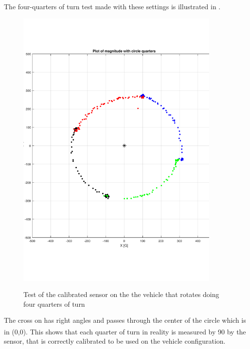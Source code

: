 The four-quarters of turn test made with these settings is illustrated in .
\begin{figure}[H]
    \centering
  {
    \includegraphics[width=0.9\textwidth]{figures/fullturn2.pdf}
  }
  \caption{Test of the calibrated sensor on the the vehicle that rotates doing four quarters of turn}
  \label{fig:calibrationTestQuarterResults}
\end{figure}

The cross on  has right angles and passes through the center of the circle which is in (0,0). This shows that each quarter of turn in reality is measured by \si{90^{\circ}} by the sensor, that is correctly calibrated to be used on the vehicle configuration.